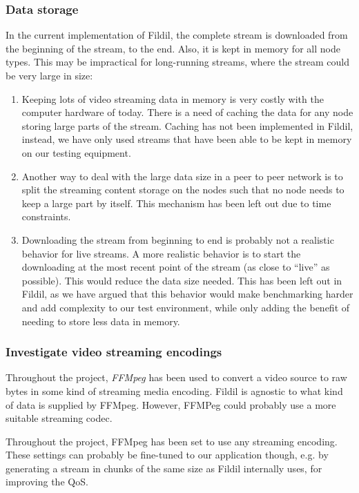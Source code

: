 \documentclass[10pt, a4paper]{article}
\begin{document}
\subsubsection{Data storage}
\label{sec:storage-improvements}

In the current implementation of Fildil, the complete stream is downloaded from
the beginning of the stream, to the end. Also, it is kept in memory for all node
types. This may be impractical for long-running streams, where the stream could
be very large in size:

\begin{enumerate}
\item Keeping lots of video streaming data in memory is very costly with the
  computer hardware of today. There is a need of caching the data for any node
  storing large parts of the stream. Caching has not been implemented in Fildil,
  instead, we have only used streams that have been able to be kept in memory on
  our testing equipment.
\item Another way to deal with the large data size in a peer to peer network is
  to split the streaming content storage on the nodes such that no node needs to
  keep a large part by itself. This mechanism has been left out due to time
  constraints. %
\item Downloading the stream from beginning to end is probably not a realistic
  behavior for live streams. A more realistic behavior is to start the
  downloading at the most recent point of the stream (as close to ``live'' as
  possible). This would reduce the data size needed. This has been left out in
  Fildil, as we have argued that this behavior would make benchmarking harder
  and add complexity to our test environment, while only adding the benefit of
  needing to store less data in memory.
\end{enumerate}

\subsubsection{Investigate video streaming encodings}

Throughout the project, \emph{FFMpeg} has been used to convert a video
source to raw bytes in some kind of streaming media encoding. Fildil
is agnostic to what kind of data is supplied by FFMpeg. However,
FFMPeg could probably use a more suitable streaming codec.

Throughout the project, FFMpeg has been set to use any streaming
encoding. These settings can probably be fine-tuned to our application
though, e.g. by generating a stream in chunks of the same size as
Fildil internally uses, for improving the QoS.
\end{document}
